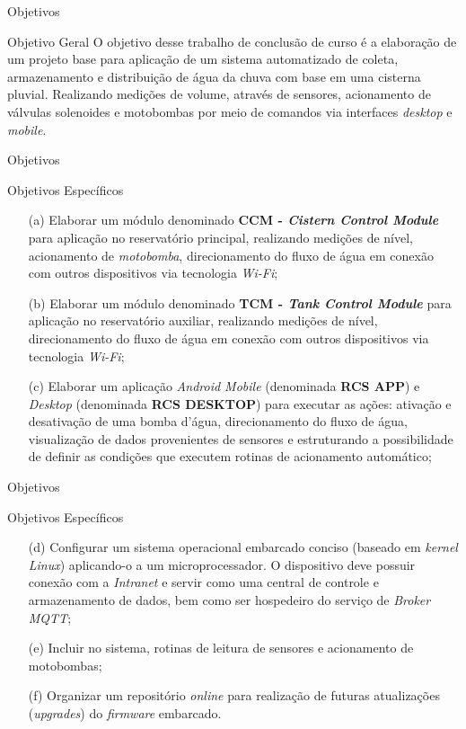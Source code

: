 \begin{frame}{Objetivos}
\begin{block}{Objetivo Geral}
    O objetivo desse trabalho de conclusão de curso é a elaboração de um projeto base para aplicação de um sistema automatizado de coleta, armazenamento e distribuição de água da chuva com base em uma cisterna pluvial. Realizando medições de volume, através de sensores, acionamento de válvulas solenoides e motobombas por meio de comandos via interfaces \textit{desktop} e \textit{mobile}.
\end{block}
\end{frame}

\begin{frame}{Objetivos}
\begin{block}{Objetivos Específicos}
\begin{itemize}
    \item [(a)] Elaborar um módulo denominado \textbf{CCM - \textit{Cistern Control Module}} para aplicação no reservatório principal, realizando medições de nível, acionamento de \textit{motobomba}, direcionamento do fluxo de água em conexão com outros dispositivos via tecnologia \textit{Wi-Fi};
	\item [(b)] Elaborar um módulo denominado \textbf{TCM - \textit{Tank Control Module}} para aplicação no reservatório auxiliar, realizando medições de nível, direcionamento do fluxo de água em conexão com outros dispositivos via tecnologia \textit{Wi-Fi};
	\item [(c)] Elaborar um aplicação \textit{Android Mobile} (denominada \textbf{RCS APP}) e \textit{Desktop} (denominada \textbf{RCS DESKTOP}) para executar as ações: ativação e desativação de uma bomba d'água, direcionamento do fluxo de água, visualização de dados provenientes de sensores e estruturando a possibilidade de definir as condições que executem rotinas de acionamento automático;
\end{itemize}
\end{block}
\end{frame}

\begin{frame}{Objetivos}
    \begin{block}{Objetivos Específicos}
    \begin{itemize}
        \item [(d)] Configurar um sistema operacional embarcado conciso (baseado em \textit{kernel Linux}) aplicando-o a um microprocessador. O dispositivo deve possuir conexão com a \textit{Intranet} e servir como uma central de controle e armazenamento de dados, bem como ser hospedeiro do serviço de \textit{Broker MQTT};
        \item [(e)] Incluir no sistema, rotinas de leitura de sensores e acionamento de motobombas;
        \item [(f)] Organizar um repositório \textit{online} para realização de futuras atualizações (\textit{upgrades}) do \textit{firmware} embarcado.
    \end{itemize}
    \end{block}
\end{frame}
